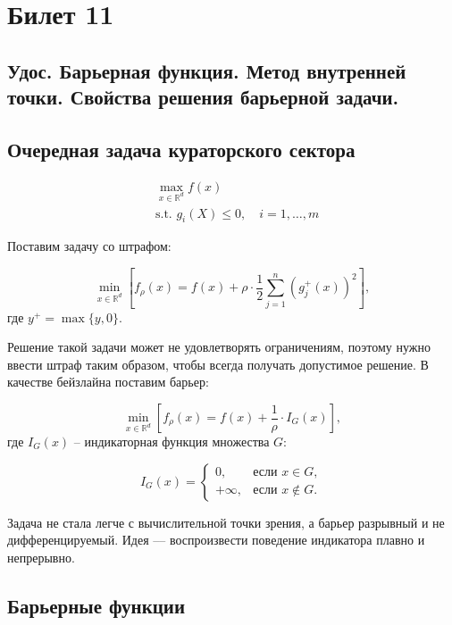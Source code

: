 \section{Билет 11}

\subsection{Удос. Барьерная функция. Метод внутренней точки. Свойства решения барьерной задачи.}

\subsection*{Очередная задача кураторского сектора}

\begin{equation}
    \begin{aligned}
         & \max_{x \in \mathbb{R}^d} f(x)                            \\
         & \text{s.t. } g_i(X) \leq 0, \quad i = 1, \dots, m
    \end{aligned}
\end{equation}

Поставим задачу со штрафом:

$$\min_{x \in \mathbb{R}^d} \left[ f_\rho(x) = f(x) + \rho \cdot \frac{1}{2} \sum_{j=1}^{n} (g_j^+(x))^2 \right],$$
где $y^+ = \max\{y, 0\}$.

Решение такой задачи может не удовлетворять ограничениям, поэтому нужно ввести штраф таким образом, чтобы всегда получать допустимое решение. В качестве бейзлайна поставим барьер:

$$\min_{x \in \mathbb{R}^d} \left[ f_\rho(x) = f(x) + \frac{1}{\rho} \cdot I_G(x) \right],$$
где $I_G(x)$ – индикаторная функция множества $G$:

$$I_G(x) =
    \begin{cases}
        0,       & \text{если } x \in G,    \\
        +\infty, & \text{если } x \notin G.
    \end{cases}$$

Задача не стала легче с вычислительной точки зрения, а барьер разрывный и не дифференцируемый.
Идея –-- воспроизвести поведение индикатора плавно и непрерывно.

\subsection*{Барьерные функции}

